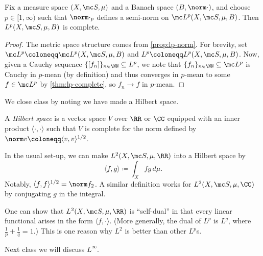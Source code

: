 \documentclass[../notes.tex]{subfiles}
\begin{document}
\begin{corollary}
	Fix a measure space $(X,\mc S,\mu)$ and a Banach space $(B,\norm\cdot)$, and choose $p\in[1,\infty)$ such that $\norm\cdot_p$ defines a semi-norm on $\mc L^p(X,\mc S,\mu,B)$. Then $L^p(X,\mc S,\mu,B)$ is complete.
\end{corollary}
\begin{proof}
	The metric space structure comes from \autoref{prop:lp-norm}. For brevity, set $\mc L^p\coloneqq\mc L^p(X,\mc S,\mu,B)$ and $L^p\coloneqq L^p(X,\mc S,\mu,B)$. Now, given a Cauchy sequence $\{[f_n]\}_{n\in\NN}\subseteq L^p$, we note that $\{f_n\}_{n\in\NN}\subseteq\mc L^p$ is Cauchy in $p$-mean (by definition) and thus converges in $p$-mean to some $f\in\mc L^p$ by \autoref{thm:lp-complete}, so $f_n\to f$ in $p$-mean.
\end{proof}
We close class by noting we have made a Hilbert space.
\begin{definition}
	A \textit{Hilbert space} is a vector space $V$ over $\RR$ or $\CC$ equipped with an inner product $\langle\cdot,\cdot\rangle$ such that $V$ is complete for the norm defined by $\norm v\coloneqq\langle v,v\rangle^{1/2}$.
\end{definition}
\begin{example}
	In the usual set-up, we can make $L^2(X,\mc S,\mu,\RR)$ into a Hilbert space by
	\[\langle f,g\rangle\coloneqq\int_Xfg\,d\mu.\]
	Notably, $\langle f,f\rangle^{1/2}=\norm f_2$. A similar definition works for $L^2(X,\mc S,\mu,\CC)$ by conjugating $g$ in the integral.
\end{example}
\begin{remark}
	One can show that $L^2(X,\mc S,\mu,\RR)$ is ``self-dual'' in that every linear functional arises in the form $\langle f,\cdot\rangle$. (More generally, the dual of $L^p$ is $L^q$, where $\frac1p+\frac1q=1$.) This is one reason why $L^2$ is better than other $L^p$s.
\end{remark}
Next class we will discuss $L^\infty$.
\end{document}
